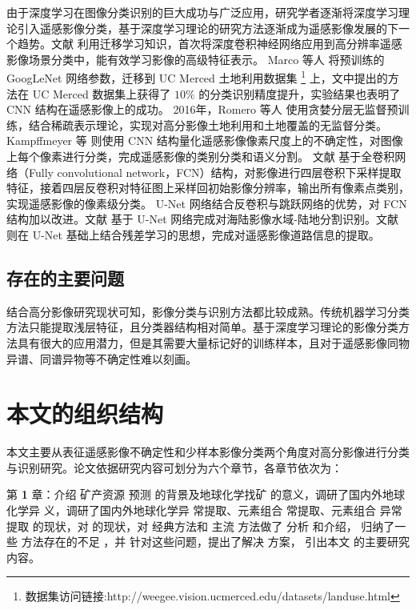 由于深度学习在图像分类识别的巨大成功与广泛应用，研究学者逐渐将深度学习理论引入遥感影像分类，基于深度学习理论的研究方法逐渐成为遥感影像发展的下一个趋势。文献 \cite{hu2015transferring} 利用迁移学习知识，首次将深度卷积神经网络应用到高分辨率遥感影像场景分类中，能有效学习影像的高级特征表示。 Marco 等人 \cite{castelluccio2015land} 将预训练的 GoogLeNet 网络参数，迁移到 UC Merced 土地利用数据集 \footnote{数据集访问链接:http://weegee.vision.ucmerced.edu/datasets/landuse.html} 上，文中提出的方法在 UC Merced 数据集上获得了 $10\%$ 的分类识别精度提升，实验结果也表明了 CNN 结构在遥感影像上的成功。 2016年，Romero 等人 \cite{romero2016unsupervised} 使用贪婪分层无监督预训练，结合稀疏表示理论，实现对高分影像土地利用和土地覆盖的无监督分类。 Kampffmeyer 等 \cite{kampffmeyer2016semantic} 则使用 CNN 结构量化遥感影像像素尺度上的不确定性，对图像上每个像素进行分类，完成遥感影像的类别分类和语义分割。 文献 \cite{maggiori2016fully} 基于全卷积网络（Fully convolutional network，FCN）结构，对影像进行四层卷积下采样提取特征，接着四层反卷积对特征图上采样回初始影像分辨率，输出所有像素点类别，实现遥感影像的像素级分类。 U-Net \cite{ronneberger2015u} 网络结合反卷积与跳跃网络的优势，对 FCN 结构加以改进。文献 \cite{li2018deepunet} 基于 U-Net 网络完成对海陆影像水域-陆地分割识别。文献 \cite{zhang2018road} 则在 U-Net 基础上结合残差学习的思想，完成对遥感影像道路信息的提取。


\subsection{存在的主要问题}
\label{subsec:1-2-3}
结合高分影像研究现状可知，影像分类与识别方法都比较成熟。传统机器学习分类方法只能提取浅层特征，且分类器结构相对简单。基于深度学习理论的影像分类方法具有很大的应用潜力，但是其需要大量标记好的训练样本，且对于遥感影像同物异谱、同谱异物等不确定性难以刻画。

\section{本文的组织结构}
\label{sec:third}
本文主要从表征遥感影像不确定性和少样本影像分类两个角度对高分影像进行分类与识别研究。论文依据研究内容可划分为六个章节，各章节依次为：

第 \textbf{1} 章：介绍 矿产资源 预测 的背景及地球化学找矿 的意义，调研了国内外地球化学异 义，调研了国内外地球化学异 常提取、元素组合 常提取、元素组合 异常提取 的现状，对 的现状，对 经典方法和 主流 方法做了 分析 和介绍， 归纳了一些 方法存在的不足 ，并 针对这些问题，提出了解决 方案， 引出本文 的主要研究内容。

